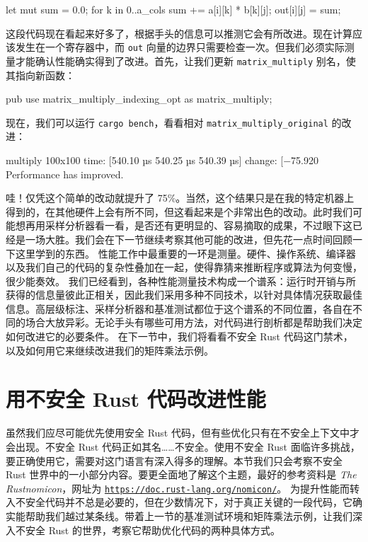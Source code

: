 \begin{codebox}[rust]
let mut sum = 0.0;
for k in 0..a_cols {
    sum += a[i][k] * b[k][j];
}
out[i][j] = sum;
\end{codebox}
这段代码现在看起来好多了，根据手头的信息可以推测它会有所改进。现在计算应该发生在一个寄存器中，而 \texttt{out} 向量的边界只需要检查一次。但我们必须实际测量才能确认性能确实得到了改进。首先，让我们更新 \texttt{matrix\_\allowbreak{}multiply} 别名，使其指向新函数：
\begin{codebox}[rust]
pub use matrix_multiply_indexing_opt as matrix_multiply;
\end{codebox}
现在，我们可以运行 \texttt{cargo bench}，看看相对 \texttt{matrix\_\allowbreak{}multiply\_\allowbreak{}original} 的改进：
\begin{codeboxdark}
multiply 100x100         time:   [540.10 µs 540.25 µs 540.39 µs]
                         change: [−75.920%
                         Performance has improved.
\end{codeboxdark}
\label{idx:idx_eebc83ee}
\label{idx:idx_91af3b93}
哇！仅凭这个简单的改动就提升了 75\%。当然，这个结果只是在我的特定机器上得到的，在其他硬件上会有所不同，但这看起来是个非常出色的改动。此时我们可能想再用采样分析器看一看，是否还有更明显的、容易摘取的成果，不过眼下这已经是一场大胜。我们会在下一节继续考察其他可能的改进，但先花一点时间回顾一下这里学到的东西。
性能工作中最重要的一环是测量。硬件、操作系统、编译器以及我们自己的代码的复杂性叠加在一起，使得靠猜来推断程序或算法为何变慢，很少能奏效。
\label{idx:idx_e7941561}
\label{idx:idx_d0826e2c}
我们已经看到，各种性能测量技术构成一个谱系：运行时开销与所获得的信息量彼此正相关，因此我们采用多种不同技术，以针对具体情况获取最佳信息。高层级标注、采样分析器和基准测试都位于这个谱系的不同位置，各自在不同的场合大放异彩。无论手头有哪些可用方法，对代码进行剖析都是帮助我们决定如何改进它的必要条件。
在下一节中，我们将看看不安全 Rust 代码这门禁术，以及如何用它来继续改进我们的矩阵乘法示例。
\section{用不安全 Rust 代码改进性能}
\label{idx:idx_696e8711}
虽然我们应尽可能优先使用安全 Rust 代码，但有些优化只有在不安全上下文中才会出现。不安全 Rust 代码正如其名……不安全。使用不安全 Rust 面临许多挑战，要正确使用它，需要对这门语言有深入得多的理解。本节我们只会考察不安全 Rust 世界中的一小部分内容。要更全面地了解这个主题，最好的参考资料是 \emph{The Rustnomicon}，网址为 \href{https://doc.rust-lang.org/nomicon/}{\texttt{https:/\allowbreak{}/\allowbreak{}doc.\allowbreak{}rust-\allowbreak{}lang.\allowbreak{}org/\allowbreak{}nomicon/\allowbreak{}}}。
为提升性能而转入不安全代码并不总是必要的，但在少数情况下，对于真正关键的一段代码，它确实能帮助我们越过某条线。带着上一节的基准测试环境和矩阵乘法示例，让我们深入不安全 Rust 的世界，考察它帮助优化代码的两种具体方式。
